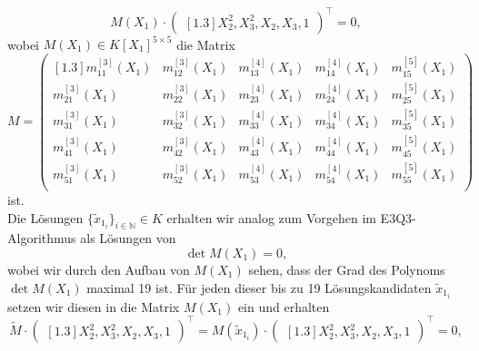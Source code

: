 \documentclass[a4paper,oneside, 11pt, openany%
]{article}
\newcommand{\N}{{\mathbb N}}
\theoremstyle{custom}
\theoremstyle{custom}
\begin{document}
\begin{equation}
	M(X_{1})\cdot\begin{pmatrix}[1.3]
		X_{2}^2,
		X_{3}^2,
		X_{2},
		X_{3},
		1
	\end{pmatrix}^\top=0,
\end{equation}
wobei $M(X_{1}) \in K[X_{1}]^{5 \times 5}$ die Matrix
\begin{equation}
	M = \begin{pmatrix}[1.3]
		m_{11}^{\left[ 3\right]}\left( X_{1}\right) & m_{12}^{\left[ 3\right]}\left( X_{1}\right) & m_{13}^{\left[ 4\right]}\left( X_{1}\right) & m_{14}^{\left[ 4\right]}\left( X_{1}\right) & m_{15}^{\left[ 5\right]}\left( X_{1}\right) \\
		m_{21}^{\left[ 3\right]}\left( X_{1}\right) & m_{22}^{\left[ 3\right]}\left( X_{1}\right) & m_{23}^{\left[ 4\right]}\left( X_{1}\right)& m_{24}^{\left[ 4\right]}\left( X_{1}\right) & m_{25}^{\left[ 5\right]}\left( X_{1}\right) \\
		m_{31}^{\left[ 3\right]}\left( X_{1}\right) & m_{32}^{\left[ 3\right]}\left( X_{1}\right) & m_{33}^{\left[ 4\right]}\left( X_{1}\right)& m_{34}^{\left[ 4\right]}\left( X_{1}\right) & m_{35}^{\left[ 5\right]}\left( X_{1}\right) \\
		m_{41}^{\left[ 3\right]}\left( X_{1}\right) & m_{42}^{\left[ 3\right]}\left( X_{1}\right) & m_{43}^{\left[ 4\right]}\left( X_{1}\right)& m_{44}^{\left[ 4\right]}\left( X_{1}\right) & m_{45}^{\left[ 5\right]}\left( X_{1}\right) \\
		m_{51}^{\left[ 3\right]}\left( X_{1}\right) & m_{52}^{\left[ 3\right]}\left( X_{1}\right) & m_{53}^{\left[ 4\right]}\left( X_{1}\right)& m_{54}^{\left[ 4\right]}\left( X_{1}\right) & m_{55}^{\left[ 5\right]}\left( X_{1}\right) \\
	\end{pmatrix}
\end{equation}
ist.\\
Die Lösungen $\{\tilde{x}_{1_{i}}\}_{i \in \N} \in K$ erhalten wir analog zum Vorgehen im E3Q3-Algorithmus als Lösungen von \begin{equation}
	\det{M(X_{1})}=0,
\end{equation}
wobei wir durch den Aufbau von $M(X_{1})$ sehen, dass der Grad des Polynoms $\det{M(X_{1})}$ maximal 19 ist.
Für jeden dieser bis zu 19 Lösungskandidaten $\tilde{x}_{1_{i}}$ setzen wir diesen in die Matrix $M(X_{1})$ ein und erhalten 
\begin{equation}\label{eqn:low_rank_system}
	\tilde{M}\cdot\begin{pmatrix}[1.3]
		X_{2}^2,
		X_{3}^2,
		X_{2},
		X_{3},
		1
	\end{pmatrix}^\top = 	M(\tilde{x}_{1_{i}})\cdot\begin{pmatrix}[1.3]
		X_{2}^2,
		X_{3}^2,
		X_{2},
		X_{3},
		1
	\end{pmatrix}^\top=0,
\end{equation}
\end{document}
